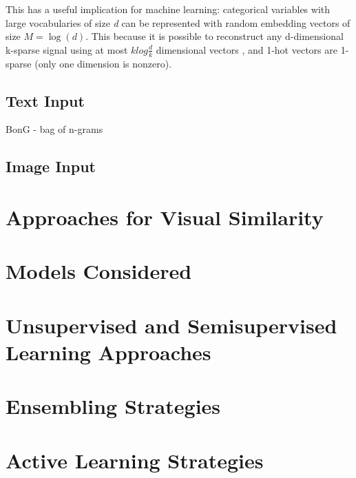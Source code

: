 This has a useful implication for machine learning: categorical variables with large vocabularies of size \textit{d}  can be  represented with  random embedding vectors of size $M = \log(d)$.
This because it is possible to reconstruct any d-dimensional k-sparse signal using at most $k  log{\frac{d}{k}}$ dimensional vectors \cite{compressive_sensing}, and 1-hot vectors are 1-sparse (only one dimension is nonzero).

\subsection{Text Input}

BonG - bag of n-grams

\subsection{Image Input}


\section{Approaches for Visual Similarity}
\label{bg_sim}


\section{Models Considered}
\label{models_considered}


\section{Unsupervised and Semisupervised Learning Approaches}
\label{unsup}


\section{Ensembling Strategies}
\label{bg_ensembling}


\section{Active Learning Strategies}
\label{bg_al}
